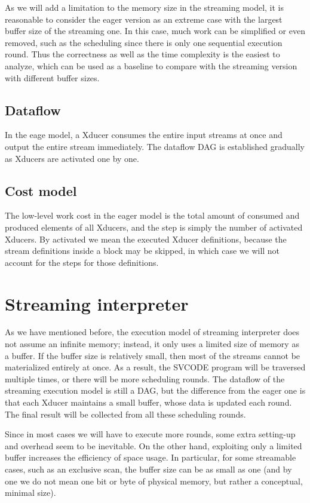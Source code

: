 As we will add a limitation to the memory size in the streaming model, it is reasonable to consider the eager version as an extreme case with the largest buffer size of the streaming one. 
In this case, much work can be simplified or even removed, such as the scheduling since there is only one sequential execution round. 
Thus the correctness as well as the time complexity is the easiest to analyze, which can be used as a baseline to compare with the streaming version with different buffer sizes.


\subsection{Dataflow}
In the eage model, a Xducer consumes the entire input streams at once and output the entire stream immediately. 
The dataflow DAG is established gradually as Xducers are activated one by one.   
\subsection{Cost model}
The low-level work cost in the eager model is the total amount of consumed and produced elements of all Xducers, and the step is simply the number of activated Xducers. 
By activated we mean the executed Xducer definitions, because the stream definitions inside a \wc block may be skipped, in which case we will not account for the steps for those definitions. 


\section{Streaming interpreter}
As we have mentioned before, the execution model of streaming interpreter does not assume an infinite memory; instead, it only uses a limited size of memory as a buffer. 
If the buffer size is relatively small, then most of the streams cannot be materialized entirely at once. 
As a result, the SVCODE program will be traversed multiple times, or there will be more scheduling rounds. 
The dataflow of the streaming execution model is still a DAG, but the difference from the eager one is that each Xducer maintains a small buffer, whose data is updated each round. 
The final result will be collected from all these scheduling rounds.

Since in most cases we will have to execute more rounds, some extra setting-up and overhead seem to be inevitable.
On the other hand, exploiting only a limited buffer increases the efficiency of space usage. 
In particular, for some streamable cases, such as an exclusive scan, the buffer size can be as small as one (and by one we do not mean one bit or byte of physical memory, but rather a conceptual, minimal size).


